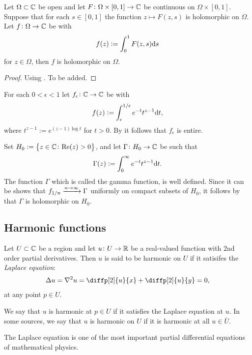 \documentclass[11pt,a4paper]{article}
\begin{document}
\begin{proposition}
  \label{prop:gamma}
  Let $\Omega \subset \mathbb{C}$ be open
  and let $F \colon \Omega \times [0,1] \to \mathbb{C}$ be continuous on
  $\Omega \times [0,1]$.
  Suppose that for each $s \in [0,1]$ the function $z \mapsto F(z,s)$ is
  holomorphic on $\Omega$.
  Let $f \colon \Omega \to \mathbb{C}$ be with
  \[
    f(z) := \int_{0}^{1} F(z,s) \mathrm{d} s
  \]
  for $z \in \Omega$, then $f$ is holomorphic on $\Omega$.
\end{proposition}
\begin{proof}
  Using . To be added.
\end{proof}

\begin{example}
  For each $0 < \epsilon < 1$ let $f_{\epsilon} \colon \mathbb{C} \to \mathbb{C}$ be with
  \[
    f(z) := \int_{\epsilon}^{1/\epsilon} e^{-t} t^{z - 1} \mathrm{d} t,
  \]
  where $t^{z-1} := e^{(z - 1) \log t}$ for $t > 0$.
  By  it follows that $f_{\epsilon}$ is entire.
  
  Set $H_0 := \left\{z \in \mathbb{C} \colon \mathrm{Re}(z) > 0\right\}$,
  and let $\Gamma \colon H_0 \to \mathbb{C}$ be such that
  \[
    \Gamma(z) := \int_{0}^{\infty} e^{-t} t^{z - 1} \mathrm{d} t.
  \]
  The function $\Gamma$ which is called the gamma function, is well defined.
  Since it can be shows that $f_{1/n} \xrightarrow{n \to \infty} \Gamma$ uniformly
  on compact subsets of $H_0$,
  it follows by 
  that $\Gamma$ is holomorphic on $H_0$.
\end{example}


\subsection{Harmonic functions}
\begin{definition}
  Let $U \subset \mathbb{C}$ be a region and let $u \colon U \to \mathbb{R}$ be a real-valued
  function with $2$nd order partial derivatives.
  Then $u$ is said to be harmonic on $U$ if it satisifes the
  \textit{Laplace equation}:
  \[
    \Delta u = \nabla^2 u = \diffp[2]{u}{x} + \diffp[2]{u}{y} = 0,
  \]
  at any point $p \in U$.
\end{definition}
\begin{remark}
  We say that $u$ is harmonic at $p \in U$ if it satisfies the Laplace
  equation at $u$.
  In some sources, we say that $u$ is harmonic on $U$ if it is harmonic
  at all $u \in \overline U$.
\end{remark}
\begin{remark}
  The Laplace equation is one of the most important partial differential
  equations of mathematical physics.
\end{remark}
\end{document}
